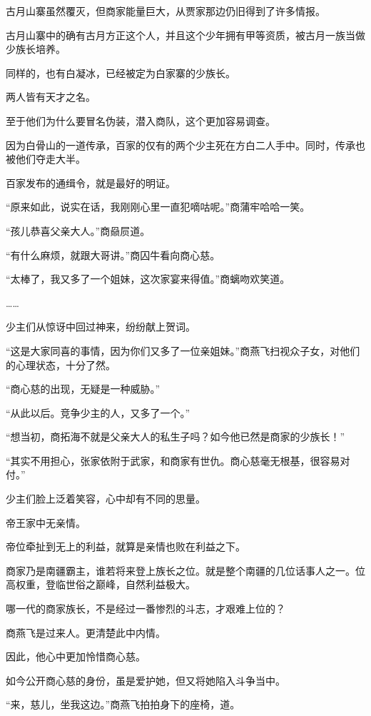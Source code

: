 \begin{this_body}
古月山寨虽然覆灭，但商家能量巨大，从贾家那边仍旧得到了许多情报。

古月山寨中的确有古月方正这个人，并且这个少年拥有甲等资质，被古月一族当做少族长培养。

同样的，也有白凝冰，已经被定为白家寨的少族长。

两人皆有天才之名。

至于他们为什么要冒名伪装，潜入商队，这个更加容易调查。

因为白骨山的一道传承，百家的仅有的两个少主死在方白二人手中。同时，传承也被他们夺走大半。

百家发布的通缉令，就是最好的明证。

“原来如此，说实在话，我刚刚心里一直犯嘀咕呢。”商蒲牢哈哈一笑。

“孩儿恭喜父亲大人。”商赑屃道。

“有什么麻烦，就跟大哥讲。”商囚牛看向商心慈。

“太棒了，我又多了一个姐妹，这次家宴来得值。”商螭吻欢笑道。

……

少主们从惊讶中回过神来，纷纷献上贺词。

“这是大家同喜的事情，因为你们又多了一位亲姐妹。”商燕飞扫视众子女，对他们的心理状态，十分了然。

“商心慈的出现，无疑是一种威胁。”

“从此以后。竞争少主的人，又多了一个。”

“想当初，商拓海不就是父亲大人的私生子吗？如今他已然是商家的少族长！”

“其实不用担心，张家依附于武家，和商家有世仇。商心慈毫无根基，很容易对付。”

少主们脸上泛着笑容，心中却有不同的思量。

帝王家中无亲情。

帝位牵扯到无上的利益，就算是亲情也败在利益之下。

商家乃是南疆霸主，谁若将来登上族长之位。就是整个南疆的几位话事人之一。位高权重，登临世俗之巅峰，自然利益极大。

哪一代的商家族长，不是经过一番惨烈的斗志，才艰难上位的？

商燕飞是过来人。更清楚此中内情。

因此，他心中更加怜惜商心慈。

如今公开商心慈的身份，虽是爱护她，但又将她陷入斗争当中。

“来，慈儿，坐我这边。”商燕飞拍拍身下的座椅，道。


\end{this_body}
